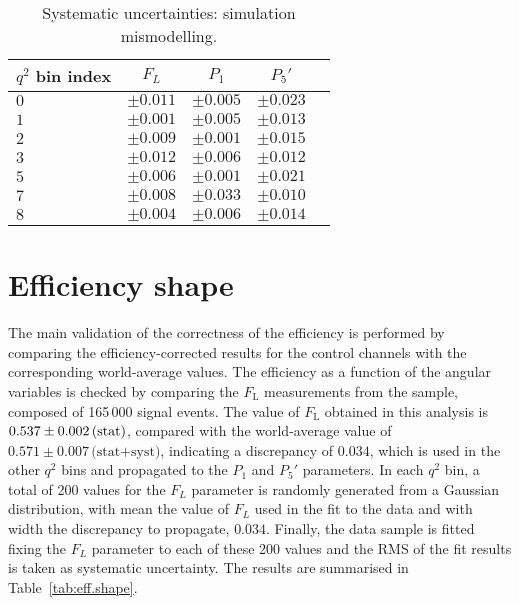 \begin{table*}[!htb]
  \begin {center}
    \begin{small}
      \caption{Systematic uncertainties: simulation mismodelling.
        \label{tab:mis.modelling}}
      \begin{tabular}{l|c|c|c|c}
        $q^2$ bin index  & $F_L$ & $P_1$ & $P_5'$ \\
        \hline
        $ 0 $ & $\pm0.011$ & $\pm0.005$ & $\pm0.023$\\
        $ 1 $ & $\pm0.001$ & $\pm0.005$ & $\pm0.013$\\
        $ 2 $ & $\pm0.009$ & $\pm0.001$ & $\pm0.015$\\
        $ 3 $ & $\pm0.012$ & $\pm0.006$ & $\pm0.012$\\
        $ 5 $ & $\pm0.006$ & $\pm0.001$ & $\pm0.021$\\
        $ 7 $ & $\pm0.008$ & $\pm0.033$ & $\pm0.010$\\
        $ 8 $ & $\pm0.004$ & $\pm0.006$ & $\pm0.014$\\
      \end{tabular}
    \end{small}
  \end{center}
\end{table*}

\section{Efficiency shape}
\label{sec:effshape-syst}

The main validation of the correctness of the efficiency is performed by comparing the efficiency-corrected results for the control channels with the corresponding world-average values.
The efficiency as a function of the angular variables is checked by comparing the $F_\mathrm{L}$ measurements from the \BtoKstJpsi sample, composed of 165\,000 signal events.
The value of $F_\mathrm{L}$ obtained in this analysis is $0.537 \pm 0.002\,\textrm{(stat)}$, compared with the world-average value of $0.571 \pm 0.007\,\text{(stat+syst)}$, indicating a discrepancy of $0.034$, which is used in the other $q^2$ bins and propagated to the $P_1$ and $P_5'$ parameters.
In each $q^2$ bin, a total of 200 values for the $F_L$ parameter is randomly generated from a Gaussian distribution, with mean the value of $F_L$ used in the fit to the data and with width the discrepancy to propagate, $0.034$.
Finally, the data sample is fitted fixing the $F_L$ parameter to each of these 200 values and the RMS of the fit results is taken as systematic uncertainty.
The results are summarised in Table~\ref{tab:eff.shape}.

